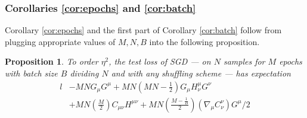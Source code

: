 \documentclass{article}
\theoremstyle{plain}
\newtheorem{prop}{Proposition}
\theoremstyle{definition}
\newcommand{\wrap}[1]{\left(#1\right)}
\begin{document}
        \subsubsection{Corollaries \ref{cor:epochs} and \ref{cor:batch}}

            Corollary \ref{cor:epochs} and the first part of Corollary
            \ref{cor:batch} follow from plugging appropriate values of $M,
            N, B$ into the following proposition.

            \begin{prop}\label{prop:ordtwo}
                To order $\eta^2$, the test loss of SGD --- on $N$
                samples for $M$ epochs with batch size $B$ dividing $N$ and with any
                shuffling scheme --- has expectation
                {\small
                \begin{align*}
                                                            l              
                    &- MN                                   G_\mu G^\mu       
                     + MN\wrap{MN - \frac{1}{2}}            G_\mu H^{\mu}_{\nu} G^\nu \\
                    &+ MN\wrap{\frac{M}{2}}                 C_{\mu \nu} H^{\mu \nu}
                     + MN\wrap{\frac{M-\frac{1}{B}}{2}}     \wrap{\nabla_\mu C^{\nu}_{\nu}} G^\mu / 2
                \end{align*}
                }
            \end{prop}
\end{document}
